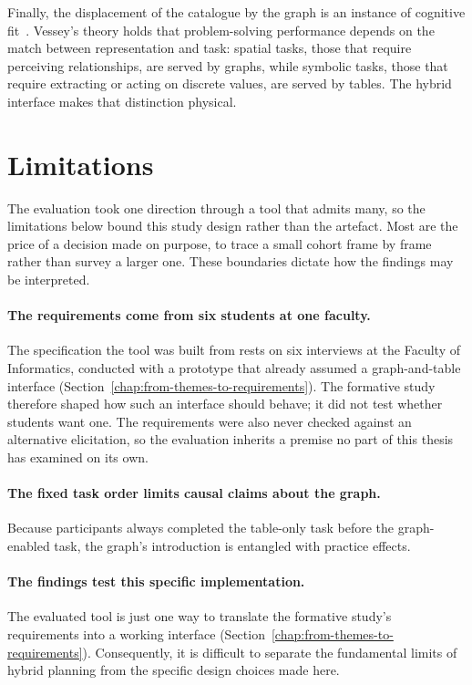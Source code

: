 Finally, the displacement of the catalogue by the graph is an instance of cognitive fit~\cite{vessey1991cognitive}. Vessey's theory holds that problem-solving performance depends on the match between representation and task: spatial tasks, those that require perceiving relationships, are served by graphs, while symbolic tasks, those that require extracting or acting on discrete values, are served by tables. The hybrid interface makes that distinction physical.



\section{Limitations}
\label{sec:disc-limitations}
The evaluation took one direction through a tool that admits many, so the limitations below bound this study design rather than the artefact. Most are the price of a decision made on purpose, to trace a small cohort frame by frame rather than survey a larger one. These boundaries dictate how the findings may be interpreted.

\paragraph{The requirements come from six students at one faculty.}
The specification the tool was built from rests on six interviews at the Faculty of Informatics, conducted with a prototype that already assumed a graph-and-table interface (Section~\ref{chap:from-themes-to-requirements}). The formative study therefore shaped how such an interface should behave; it did not test whether students want one. The requirements were also never checked against an alternative elicitation, so the evaluation inherits a premise no part of this thesis has examined on its own.


\paragraph{The fixed task order limits causal claims about the graph.} 
Because participants always completed the table-only task before the graph-enabled task, the graph's introduction is entangled with practice effects. 

\paragraph{The findings test this specific implementation.} 
The evaluated tool is just one way to translate the formative study's requirements into a working interface (Section~\ref{chap:from-themes-to-requirements}). Consequently, it is difficult to separate the fundamental limits of hybrid planning from the specific design choices made here.

